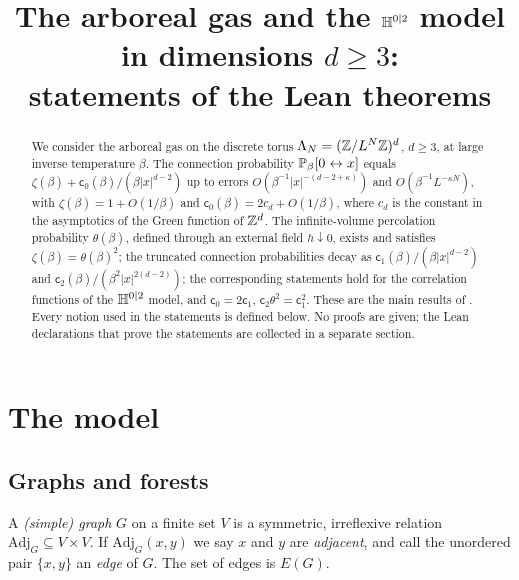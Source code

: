 \documentclass[11pt]{amsart}
\title{The arboreal gas and the $\mathbb{H}^{0|2}$ model in dimensions $d\ge3$:\\ statements of the Lean theorems}
\date{}
\numberwithin{equation}{section}
\numberwithin{theorem}{section}
\newcommand{\conn}{\leftrightarrow}
\begin{document}
\sloppy

\begin{abstract}
  We consider the arboreal gas on the discrete torus $\Lambda_N=(\mathbb{Z}/L^N\mathbb{Z})^d$, $d\ge3$, at large
  inverse temperature $\beta$. The connection probability $\P_\beta[0\conn x]$ equals
  $\zeta(\beta)+\mathsf c_0(\beta)/(\beta|x|^{d-2})$ up to errors $O(\beta^{-1}|x|^{-(d-2+\kappa)})$
  and $O(\beta^{-1}L^{-\kappa N})$, with $\zeta(\beta)=1+O(1/\beta)$ and
  $\mathsf c_0(\beta)=2c_d+O(1/\beta)$, where $c_d$ is the constant in the asymptotics of the Green
  function of $\mathbb{Z}^d$. The infinite-volume percolation probability $\theta(\beta)$, defined through an
  external field $h\downarrow0$, exists and satisfies $\zeta(\beta)=\theta(\beta)^2$; the truncated
  connection probabilities decay as $\mathsf c_1(\beta)/(\beta|x|^{d-2})$ and
  $\mathsf c_2(\beta)/(\beta^2|x|^{2(d-2)})$; the corresponding statements hold for the correlation
  functions of the $\mathbb{H}^{0|2}$ model, and $\mathsf c_0=2\mathsf c_1$, $\mathsf c_2\theta^2=\mathsf c_1^2$.
  These are the main results of \cite{BCH24}. Every notion used in the statements is defined below.
  No proofs are given; the Lean declarations that prove the statements are collected in a separate
  section.
\end{abstract}

\maketitle

\section{The model}

\subsection{Graphs and forests}

\begin{definition}[Graph]\label{def:graph}
A \emph{(simple) graph} $G$ on a finite set $V$ is a symmetric, irreflexive relation
$\mathrm{Adj}_G \subseteq V\times V$. If $\mathrm{Adj}_G(x,y)$ we say $x$ and $y$ are
\emph{adjacent}, and call the unordered pair $\{x,y\}$ an \emph{edge} of $G$. The set of edges
is $E(G)$.
\end{definition}
\end{document}
